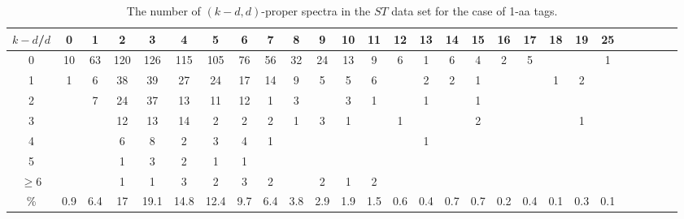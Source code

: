 \documentclass{article}[12pt]
\begin{document}
\begin{landscape}

\begin{table}[h]\footnotesize
{\centering
\begin{tabular}{|c|c|
c|c|c|c|c|c|c|c|c|c|c|c|c|c|c|c|c|c|c|c|c|c|c|c|c|}
  \hline
  $k-d$/$d$ 
 & 0 & 1 & 2 & 3 & 4 & 5 & 6 & 7 & 8 & 9 & 10 & 11 & 12 & 13 & 14 & 15 & 16 & 17 & 18 & 19 & 25\\

  \hline
  \hline

0 & 10 & 63 & 120 & 126 & 115 & 105 & 76 & 56 & 32 & 24 & 13 & 9 & 6 & 1 & 6 & 4 & 2 & 5 &  &  & 1\\

1 & 1 & 6 & 38 & 39 & 27 & 24 & 17 & 14 & 9 & 5 & 5 & 6 &  & 2 & 2 & 1 &  &  & 1 & 2 & \\

2 &  & 7 & 24 & 37 & 13 & 11 & 12 & 1 & 3 &  & 3 & 1 &  & 1 &  & 1 &  &  &  &  & \\

3 &  &  & 12 & 13 & 14 & 2 & 2 & 2 & 1 & 3 & 1 &  & 1 &  &  & 2 &  &  &  & 1 & \\

4 &  &  & 6 & 8 & 2 & 3 & 4 & 1 &  &  &  &  &  & 1 &  &  &  &  &  &  & \\

5 &  &  & 1 & 3 & 2 & 1 & 1 &  &  &  &  &  &  &  &  &  &  &  &  &  & \\

$\ge6 $  &  &  & 1 & 1 & 3 & 2 & 3 & 2 &  & 2 & 1 & 2 &  &  &  &  &  &  &  &  & \\

  \hline

 \%  & 0.9 & 6.4 & 17 & 19.1 & 14.8 & 12.4 & 9.7 & 6.4 & 3.8 & 2.9 & 1.9 & 1.5 & 0.6 & 0.4 & 0.7 & 0.7 & 0.2 & 0.4 & 0.1 & 0.3 & 0.1\\

  \hline
\end{tabular}
\par}
\centering
\caption{The number of $(k-d,d)$-proper spectra in the $ST$ data set for the case of 1-aa tags.}
\vspace{3mm}
\label{table:kd-1-proper-ST2}
\end{table}
\end{landscape}
\end{document}
